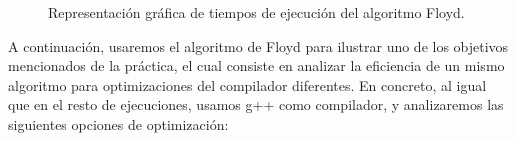 \documentclass{homework}
\begin{document}
    \begin{figure}
        \centering


        \caption{Representación gráfica de tiempos de ejecución del algoritmo Floyd.}

        \label{emp:floyd}
    \end{figure}

    A continuación, usaremos el algoritmo de Floyd para ilustrar uno de los objetivos mencionados de la práctica, 
    el cual consiste en analizar la eficiencia de un mismo algoritmo para optimizaciones del compilador diferentes.
    En concreto, al igual que en el resto de ejecuciones, usamos g++ como compilador, y analizaremos las siguientes
    opciones de optimización:
\end{document}
